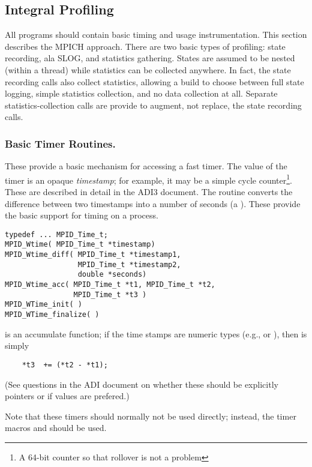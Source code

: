 \documentclass{article}
\begin{document}
\subsection{Integral Profiling}
\label{sec:builtin-timing}
All programs should contain basic timing and usage instrumentation.  This
section describes the MPICH approach.
There are two basic types of profiling: state recording, ala SLOG, and
statistics gathering.  States are assumed to be nested (within a
thread) while statistics can be collected anywhere.  In fact, the
state recording calls also collect statistics, allowing a build to
choose between full state logging, simple statistics collection, and
no data collection at all.  Separate statistics-collection calls are
provide to augment, not replace, the state recording calls.

\subsubsection{Basic Timer Routines.}
These provide a basic mechanism for accessing a fast timer.  The value of the
timer is an opaque \emph{timestamp}; for example, it may be a simple cycle
counter\footnote{A 64-bit counter so that rollover is not a problem}.  These
are described in detail in the ADI3 document. 
The routine  converts the difference
between two timestamps into a number of seconds (a ).  These
provide the basic support for timing on a process.  

\begin{verbatim}
typedef ... MPID_Time_t;
MPID_Wtime( MPID_Time_t *timestamp)
MPID_Wtime_diff( MPID_Time_t *timestamp1, 
                 MPID_Time_t *timestamp2, 
                 double *seconds)
MPID_Wtime_acc( MPID_Time_t *t1, MPID_Time_t *t2, 
                MPID_Time_t *t3 )
MPID_WTime_init( )
MPID_WTime_finalize( )
\end{verbatim}
 is an accumulate function; if the time stamps are numeric
types (e.g.,  or ), then  is
simply
\begin{verbatim}
    *t3  += (*t2 - *t1);
\end{verbatim}
(See questions in the ADI document on whether these should be explicitly
pointers or if values are prefered.)

Note that these timers should normally not be used directly; instead,
the timer macros  and
 should be used.  
\end{document}
